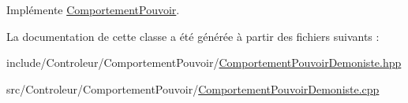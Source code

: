 Implémente \hyperlink{class_comportement_pouvoir_a8b8f4e753291ab73ab0016106f3948ff}{Comportement\-Pouvoir}.



La documentation de cette classe a été générée à partir des fichiers suivants \-:\begin{DoxyCompactItemize}
\item 
include/\-Controleur/\-Comportement\-Pouvoir/\hyperlink{_comportement_pouvoir_demoniste_8hpp}{Comportement\-Pouvoir\-Demoniste.\-hpp}\item 
src/\-Controleur/\-Comportement\-Pouvoir/\hyperlink{_comportement_pouvoir_demoniste_8cpp}{Comportement\-Pouvoir\-Demoniste.\-cpp}\end{DoxyCompactItemize}
